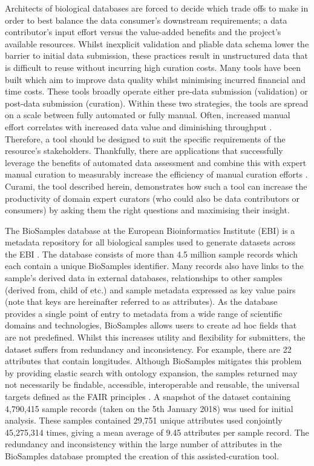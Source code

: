 \documentclass{bmcart}
\begin{document}
Architects of biological databases are forced to decide which trade offs to make in order to best balance the data consumer's downstream requirements; a data contributor's input effort versus the value-added benefits and the project's available resources. Whilst inexplicit validation and pliable data schema lower the barrier to initial data submission, these practices result in unstructured data that is difficult to reuse without incurring high curation costs. Many tools have been built which aim to improve data quality whilst minimising incurred financial and time costs. These tools broadly operate either pre-data submission (validation) or post-data submission (curation). Within these two strategies, the tools are spread on a scale between fully automated or fully manual. Often, increased manual effort correlates with increased data value and diminishing throughput \cite{goble2008data}. Therefore, a tool should be designed to suit the specific requirements of the resource's stakeholders. Thankfully, there are applications that successfully leverage the benefits of automated data assessment and combine this with expert manual curation to measurably increase the efficiency of manual curation efforts \cite{salgado2012myminer, salimi2006biocurator, szostak2015construction}. Curami, the tool described herein, demonstrates how such a tool can increase the productivity of domain expert curators (who could also be data contributors or consumers) by asking them the right questions and maximising their insight.

The BioSamples database at the European Bioinformatics Institute (EBI) is a metadata repository for all biological samples used to generate datasets across the EBI \cite{gostev2011biosample, faulconbridge2013updates}. The database consists of more than 4.5 million sample records which each contain a unique BioSamples identifier. Many records also have links to the sample's derived data in external databases, relationships to other samples (derived from, child of etc.) and sample metadata expressed as key value pairs (note that keys are hereinafter referred to as attributes). As the database provides a single point of entry to metadata from a wide range of scientific domains and technologies, BioSamples allows users to create ad hoc fields that are not predefined. Whilst this increases utility and flexibility for submitters, the dataset suffers from redundancy and inconsistency. For example, there are 22 attributes that contain longitudes. Although BioSamples mitigates this problem by providing elastic search with ontology expansion, the samples returned may not necessarily be findable, accessible, interoperable and reusable, the universal targets defined as the FAIR principles \cite{wilkinson2016fair}. A snapshot of the dataset containing 4,790,415 sample records (taken on the 5th January 2018) was used for initial analysis. These samples contained 29,751 unique attributes used conjointly 45,275,314 times, giving a mean average of 9.45 attributes per sample record. The redundancy and inconsistency within the large number of attributes in the BioSamples database prompted the creation of this assisted-curation tool.
\end{document}

